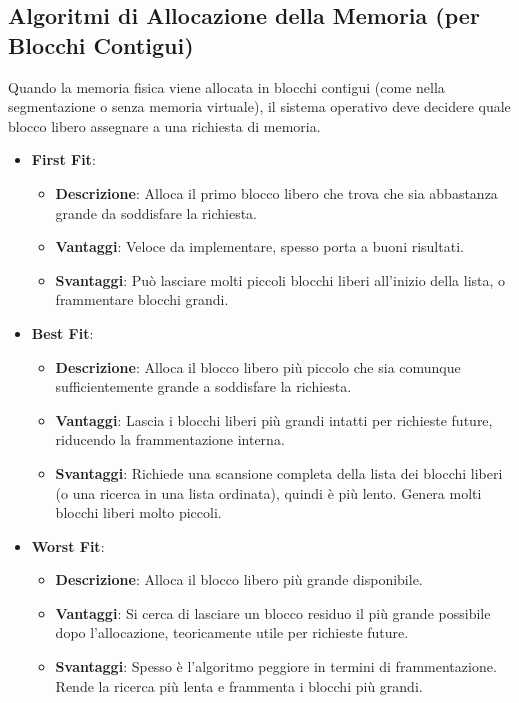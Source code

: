 \subsection{Algoritmi di Allocazione della Memoria (per Blocchi Contigui)}
Quando la memoria fisica viene allocata in blocchi contigui (come nella segmentazione o senza memoria virtuale), il sistema operativo deve decidere quale blocco libero assegnare a una richiesta di memoria.
\begin{itemize}
    \item \textbf{First Fit}:
    \begin{itemize}
        \item \textbf{Descrizione}: Alloca il primo blocco libero che trova che sia abbastanza grande da soddisfare la richiesta.
        \item \textbf{Vantaggi}: Veloce da implementare, spesso porta a buoni risultati.
        \item \textbf{Svantaggi}: Può lasciare molti piccoli blocchi liberi all'inizio della lista, o frammentare blocchi grandi.
    \end{itemize}
    \item \textbf{Best Fit}:
    \begin{itemize}
        \item \textbf{Descrizione}: Alloca il blocco libero più piccolo che sia comunque sufficientemente grande a soddisfare la richiesta.
        \item \textbf{Vantaggi}: Lascia i blocchi liberi più grandi intatti per richieste future, riducendo la frammentazione interna.
        \item \textbf{Svantaggi}: Richiede una scansione completa della lista dei blocchi liberi (o una ricerca in una lista ordinata), quindi è più lento. Genera molti blocchi liberi molto piccoli.
    \end{itemize}
    \item \textbf{Worst Fit}:
    \begin{itemize}
        \item \textbf{Descrizione}: Alloca il blocco libero più grande disponibile.
        \item \textbf{Vantaggi}: Si cerca di lasciare un blocco residuo il più grande possibile dopo l'allocazione, teoricamente utile per richieste future.
        \item \textbf{Svantaggi}: Spesso è l'algoritmo peggiore in termini di frammentazione. Rende la ricerca più lenta e frammenta i blocchi più grandi.
    \end{itemize}
\end{itemize}

